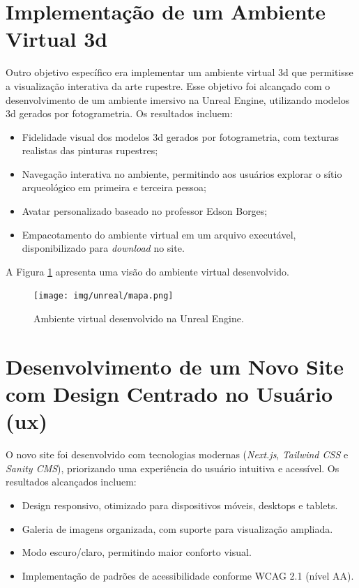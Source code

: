 \section{Implementação de um Ambiente Virtual \gls{3d}}
Outro objetivo específico era implementar um ambiente virtual \gls{3d} que permitisse a visualização interativa da arte rupestre. Esse objetivo foi alcançado com o desenvolvimento de um ambiente imersivo na Unreal Engine, utilizando modelos \gls{3d} gerados por fotogrametria. Os resultados incluem:
\begin{itemize}
    \item Fidelidade visual dos modelos \gls{3d} gerados por fotogrametria, com texturas realistas das pinturas rupestres;
    \item Navegação interativa no ambiente, permitindo aos usuários explorar o sítio arqueológico em primeira e terceira pessoa;
    \item Avatar personalizado baseado no professor Edson Borges;
    \item Empacotamento do ambiente virtual em um arquivo executável, disponibilizado para \textit{download} no site.
\end{itemize}

A Figura \ref{fig:virtual_environment} apresenta uma visão do ambiente virtual desenvolvido.

\begin{figure}[H]
    \centering
    \texttt{[image: img/unreal/mapa.png]}
    \caption{Ambiente virtual desenvolvido na Unreal Engine.}
    \label{fig:virtual_environment}
\end{figure}

\section{Desenvolvimento de um Novo Site com Design Centrado no Usuário (\gls{ux})}
O novo site foi desenvolvido com tecnologias modernas (\textit{Next.js}, \textit{Tailwind CSS} e \textit{Sanity CMS}), priorizando uma experiência do usuário intuitiva e acessível. Os resultados alcançados incluem:
\begin{itemize}
    \item Design responsivo, otimizado para dispositivos móveis, desktops e tablets.
    \item Galeria de imagens organizada, com suporte para visualização ampliada.
    \item Modo escuro/claro, permitindo maior conforto visual.
    \item Implementação de padrões de acessibilidade conforme WCAG 2.1 (nível AA).
\end{itemize}


